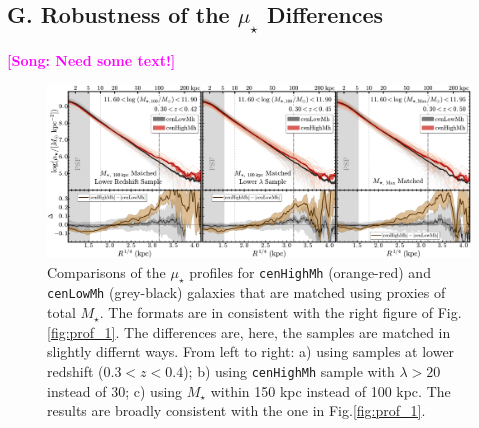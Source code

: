 \documentclass{emulateapj}
\def\rbcg{\texttt{cenHighMh}}
\def\nbcg{\texttt{cenLowMh}}
\def\mstar{{$M_{\star}$}}
\def\mden{{$\mu_{\star}$}}
\newcommand{\song}[1]{\textcolor{magenta}{\textbf{[Song: #1]}}}
\begin{document}
\begin{CJK*}{UTF8}{gbsn}
    
\section{G. Robustness of the \mden{} Differences} 
	\label{app:robust}
    
    \song{Need some text!}
 
  \begin{figure}[t!]
      \centering 
      \includegraphics[width=\textwidth]{fig/redbcg_prof_3}
      \caption{Comparisons of the \mden{} profiles for \rbcg{} (orange-red) and \nbcg{} 
      	(grey-black) galaxies that are matched using proxies of total \mstar{}. 
        The formats are in consistent with the right figure of Fig.\ref{fig:prof_1}.
        The differences are, here, the samples are matched in slightly differnt ways. 
        From left to right: a) using samples at lower redshift ($0.3 < z < 0.4$); 
        b) using \rbcg{} sample with $\lambda > 20$ instead of 30; 
        c) using \mstar{} within 150 kpc instead of 100 kpc.
        The results are broadly consistent with the one in Fig.\ref{fig:prof_1}.}
      \label{fig:prof_3} 
  \end{figure}


\end{CJK*}
\end{document}
